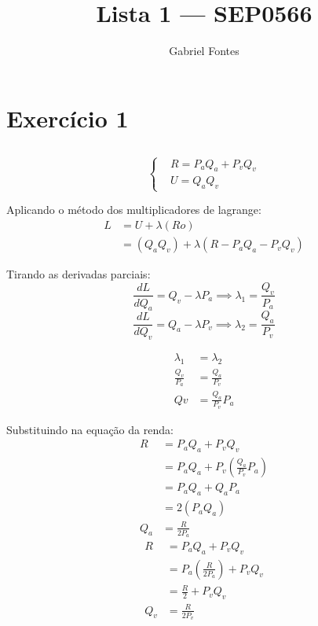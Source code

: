 \documentclass{article}
\title{Lista 1 --- SEP0566}
\author{Gabriel Fontes}
\begin{document}
\maketitle

\section{Exercício 1}
\subsection{}
\subsection{}
\subsection{}

\[
	\left\{
	\begin{aligned}
		 & R = P_a Q_a + P_v Q_v \\
		 & U = Q_a Q_v
	\end{aligned}
	\right.
\]

Aplicando o método dos multiplicadores de lagrange:
\[
	\begin{aligned}
		L & = U + \lambda(Ro)                            \\
		  & = (Q_a Q_v) + \lambda(R - P_a Q_a - P_v Q_v)
	\end{aligned}
\]

Tirando as derivadas parciais:
\[
	\frac{dL}{dQ_a} = Q_v - \lambda P_a
	\implies
	\lambda_1 = \frac{Q_v}{P_a}
\]
\[
	\frac{dL}{dQ_v} = Q_a - \lambda P_v
	\implies
	\lambda_2 = \frac{Q_a}{P_v}
\]

\[
	\begin{aligned}
		\lambda_1       & = \lambda_2          \\
		\frac{Q_v}{P_a} & = \frac{Q_a}{P_v}    \\
		Qv              & = \frac{Q_a}{P_v}P_a
	\end{aligned}
\]

Substituindo na equação da renda:
\[
	\begin{aligned}
		R   & = P_a Q_a + P_v Q_v                            \\
		    & = P_a Q_a + P_v\left(\frac{Q_a}{P_v}P_a\right) \\
		    & = P_a Q_a + Q_a P_a                            \\
		    & = 2(P_a Q_a)                                   \\
		Q_a & = \frac{R}{2P_a}
	\end{aligned}
\]
\[
	\begin{aligned}
		R   & = P_a Q_a + P_v Q_v                        \\
		    & = P_a\left(\frac{R}{2P_a}\right) + P_v Q_v \\
		    & = \frac{R}{2} + P_v Q_v                    \\
		Q_v & = \frac{R}{2P_v}
	\end{aligned}
\]
\end{document}
